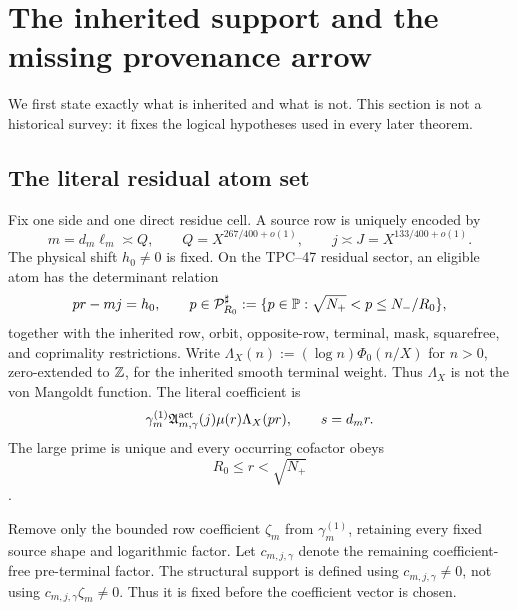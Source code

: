 \section{The inherited support and the missing provenance arrow}
\label{sec:provenance-audit}

We first state exactly what is inherited and what is not.  This section is
not a historical survey: it fixes the logical hypotheses used in every
later theorem.

\subsection{The literal residual atom set}

Fix one side and one direct residue cell.  A source row is uniquely encoded
by
\begin{equation}
 m=d_m\ell_m\asymp Q,
 \qquad
 Q=X^{267/400+o(1)},
 \qquad
 j\asymp J=X^{133/400+o(1)}.
 \label{eq:audit-scales}
\end{equation}
The physical shift \(h_0\ne0\) is fixed.  On the TPC--47 residual sector,
an eligible atom has the determinant relation
\begin{equation}
 pr-mj=h_0,
 \qquad
 p\in\mathcal P_{R_0}^{\sharp}
 :=\{p\in\mathbb P:\sqrt{N_+}<p\le N_-/R_0\},
 \label{eq:audit-band-determinant}
\end{equation}
together with the inherited row, orbit, opposite-row, terminal, mask,
squarefree, and coprimality restrictions.  Write
\(\Lambda_X(n):=(\log n)\Phi_0(n/X)\) for \(n>0\), zero-extended to
\(\mathbb Z\), for the inherited smooth terminal weight.  Thus \(\Lambda_X\) is
not the von Mangoldt function.  The literal coefficient is
\begin{equation}
 \gamma_m^{(1)}\mathfrak A_{m,\gamma}^{\rm act}(j)
 \mu(r)\Lambda_X(pr),
 \qquad s=d_mr.
 \label{eq:audit-literal-coefficient}
\end{equation}
The large prime is unique and every occurring cofactor obeys
\begin{equation}
 R_0\le r<\sqrt{N_+}
 \label{eq:audit-cofactor-range}
\end{equation}
\citep{WangTPC45,WangTPC47}.

Remove only the bounded row coefficient \(\zeta_m\) from
\(\gamma_m^{(1)}\), retaining every fixed source shape and logarithmic
factor.  Let \(c_{m,j,\gamma}\) denote the remaining coefficient-free
pre-terminal factor.  The structural support is defined using
\(c_{m,j,\gamma}\ne0\), not using \(c_{m,j,\gamma}\zeta_m\ne0\).  Thus it
is fixed before the coefficient vector is chosen.


